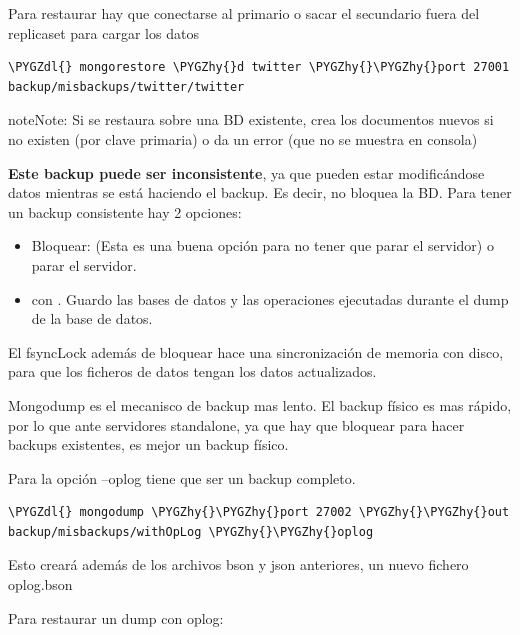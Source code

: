\documentclass[a4paper,10pt,english]{sphinxmanual}
\def\PYGZdl{\char`\$}
\def\PYGZhy{\char`\-}
\begin{document}
Para restaurar hay que conectarse al primario o sacar el secundario fuera del replicaset para cargar los datos

\begin{Verbatim}[commandchars=\\\{\}]
\PYGZdl{} mongorestore \PYGZhy{}d twitter \PYGZhy{}\PYGZhy{}port 27001 backup/misbackups/twitter/twitter
\end{Verbatim}

\begin{notice}{note}{Note:}
Si se restaura sobre una BD existente, crea los documentos nuevos si no existen (por clave primaria) o da un error (que no se muestra en consola)
\end{notice}

\textbf{Este backup puede ser inconsistente}, ya que pueden estar modificándose datos mientras se está haciendo el backup. Es decir, no bloquea la BD. Para tener un backup consistente hay 2 opciones:
\begin{itemize}
\item {} 
Bloquear:  (Esta es una buena opción para no tener que parar el servidor) o parar el servidor.

\item {} 
 con . Guardo las bases de datos y las operaciones ejecutadas durante el dump de la base de datos.

\end{itemize}

El fsyncLock además de bloquear hace una sincronización de memoria con disco, para que los ficheros de datos tengan los datos actualizados.

Mongodump es el mecanisco de backup mas lento. El backup físico es mas rápido, por lo que ante servidores standalone, ya que hay que bloquear para hacer backups existentes, es mejor un backup físico.

Para la opción --oplog tiene que ser un backup completo.

\begin{Verbatim}[commandchars=\\\{\}]
\PYGZdl{} mongodump \PYGZhy{}\PYGZhy{}port 27002 \PYGZhy{}\PYGZhy{}out backup/misbackups/withOpLog \PYGZhy{}\PYGZhy{}oplog
\end{Verbatim}

Esto creará además de los archivos bson y json anteriores, un nuevo fichero oplog.bson

Para restaurar un dump con oplog:
\end{document}
